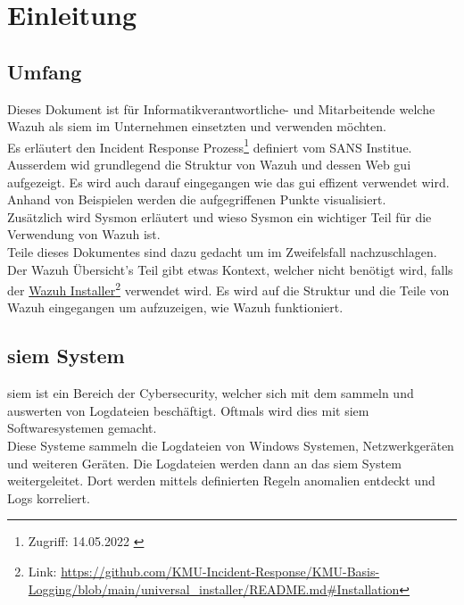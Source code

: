 \chapter{Einleitung}

\section{Umfang}
Dieses Dokument ist für Informatikverantwortliche- und Mitarbeitende welche Wazuh als \acrshort{siem} im Unternehmen einsetzten und verwenden möchten.\\

Es erläutert den Incident Response Prozess\footnote{Zugriff: 14.05.2022 \cite{sans-incident-handler-handbook}} definiert vom SANS Institue. 
Ausserdem wid grundlegend die Struktur von Wazuh und dessen Web \acrshort{gui} aufgezeigt.
Es wird auch darauf eingegangen wie das \acrshort{gui} effizent verwendet wird.
Anhand von Beispielen werden die aufgegriffenen Punkte visualisiert.\\

Zusätzlich wird Sysmon erläutert und wieso Sysmon ein wichtiger Teil für die Verwendung von Wazuh ist.\\

Teile dieses Dokumentes sind dazu gedacht um im Zweifelsfall nachzuschlagen.
Der Wazuh Übersicht's Teil gibt etwas Kontext, welcher nicht benötigt wird, falls der \href{https://github.com/KMU-Incident-Response/KMU-Basis-Logging/blob/main/universal\_installer/README.md\#Installation}{Wazuh Installer}\footnote{Link: \href{https://github.com/KMU-Incident-Response/KMU-Basis-Logging/blob/main/universal\_installer/README.md\#Installation}{https://github.com/KMU-Incident-Response/KMU-Basis-Logging/blob/main/universal\_installer/README.md\#Installation}} verwendet wird.
Es wird auf die Struktur und die Teile von Wazuh eingegangen um aufzuzeigen, wie Wazuh funktioniert.  


\section{\acrshort{siem} System}
\acrfull{siem} ist ein Bereich der Cybersecurity, welcher sich mit dem sammeln und auswerten von Logdateien beschäftigt.
Oftmals wird dies mit \acrshort{siem} Softwaresystemen gemacht.\\

Diese Systeme sammeln die Logdateien von Windows Systemen, Netzwerkgeräten und weiteren Geräten.
Die Logdateien werden dann an das \acrshort{siem} System weitergeleitet.
Dort werden mittels definierten Regeln anomalien entdeckt und Logs korreliert.

